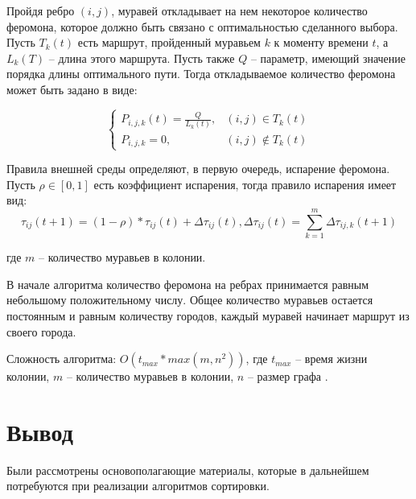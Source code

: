 Пройдя ребро $(i, j)$, муравей откладывает на нем некоторое количество феромона, которое должно быть связано с оптимальностью сделанного выбора. Пусть $T_k(t)$ есть маршрут, пройденный муравьем $k$ к моменту времени $t$, а $L_k(T)$ -- длина этого маршрута. Пусть также $Q$ -- параметр, имеющий значение порядка длины оптимального пути. Тогда откладываемое количество феромона может быть задано в виде:

\begin{equation}
\label{for:pheromon}
	\begin{cases}
		P_{i,j,k}(t) = \frac{Q}{L_k(t)}, & (i, j) \in T_k(t)\\
		P_{i,j,k} = 0, & (i, j) \not\in T_k(t)
	\end{cases}
\end{equation}

Правила внешней среды определяют, в первую очередь, испарение феромона. Пусть $\rho \in [0,1]$ есть коэффициент испарения, тогда правило испарения имеет вид:
\begin{equation}
\label{for:pheromon_rho}
	\tau_{ij}(t + 1) = (1 - \rho)*\tau_{ij}(t) + \Delta\tau_{ij}(t), \Delta\tau_{ij}(t) = \sum_{k=1}^m \Delta\tau_{ij,k}(t + 1)
\end{equation}

где $m$ -- количество муравьев в колонии.

В начале алгоритма количество феромона на ребрах принимается равным небольшому положительному числу. Общее количество муравьев остается постоянным и равным количеству городов, каждый муравей начинает маршрут из своего города.

Сложность алгоритма: $O(t_{max} * max(m, n^2))$, где $t_{max}$ -- время жизни колонии, $m$ -- количество муравьев в колонии, $n$ – размер графа \cite{analyse_2}.

\section{Вывод}

Были рассмотрены основополагающие материалы, которые в дальнейшем потребуются при реализации алгоритмов сортировки. 